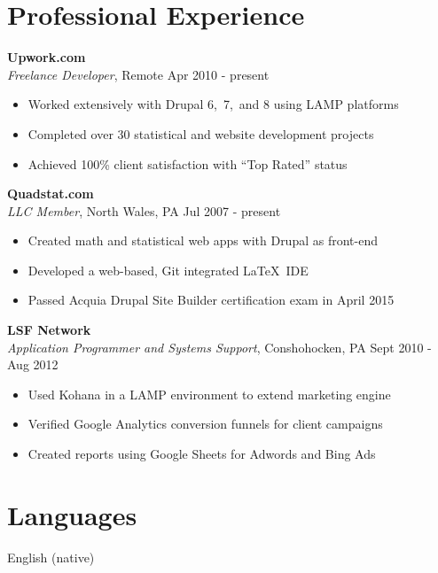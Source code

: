 \documentclass[margin,line]{res}
\begin{document}
\begin{resume}
\section{\sc Professional Experience}  {\bf Upwork.com} \\
{\em Freelance Developer}, Remote \hfill Apr 2010 - present

   \begin{itemize} \itemsep -2pt
   \item Worked extensively with Drupal 6,\ 7,\ and 8 using LAMP platforms
   \item Completed over 30 statistical and website development projects
   \item Achieved 100\% client satisfaction with ``Top Rated'' status
 \end{itemize}

{\bf Quadstat.com} \\
{\em LLC Member}, North Wales, PA \hfill Jul 2007 - present

   \begin{itemize} \itemsep -2pt
   \item Created math and statistical web apps with Drupal as front-end
   \item Developed a web-based, Git integrated \LaTeX\ IDE
   \item Passed Acquia Drupal Site Builder certification exam in April 2015

 \end{itemize}
{\bf LSF Network} \\
{\em Application Programmer and Systems Support}, Conshohocken, PA  \hfill Sept 2010 - Aug 2012

 \begin{itemize} \itemsep -2pt
  \item  Used Kohana in a LAMP environment to extend marketing engine
  \item  Verified Google Analytics conversion funnels for client campaigns
  \item  Created reports using Google Sheets for Adwords and Bing Ads
\end{itemize}

\section{\sc Languages} English (native)

\end{resume}
\end{document}
